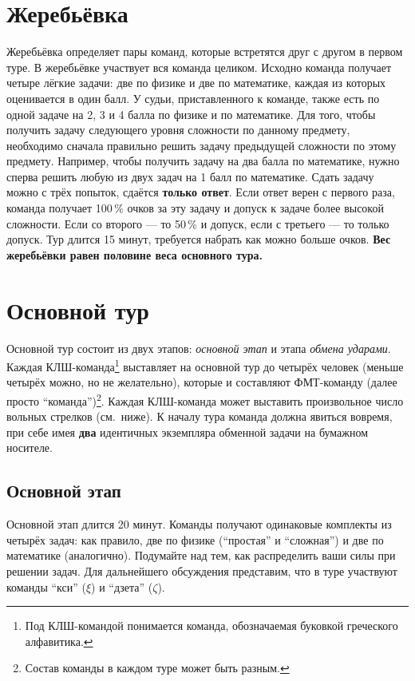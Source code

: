 \documentclass[12pt]{article}
\begin{document}
\section*{Жеребьёвка}
Жеребьёвка определяет пары команд, которые встретятся друг с другом в первом туре. В жеребьёвке участвует вся команда целиком. Исходно команда получает четыре лёгкие задачи: две по физике и две по математике, каждая из которых оценивается в один балл. У судьи, приставленного к команде, также есть по одной задаче на 2, 3 и 4 балла по физике и по математике. Для того, чтобы получить задачу следующего уровня сложности по данному предмету, необходимо сначала правильно решить задачу предыдущей сложности по этому предмету. Например, чтобы получить задачу на два балла по математике, нужно сперва решить любую из двух задач на 1 балл по математике. Сдать задачу можно с трёх попыток, сдаётся {\bf только ответ}. Если ответ верен с первого раза, команда получает 100\,\% очков за эту задачу и допуск к задаче более высокой сложности. Если со второго --- то 50\,\% и допуск, если с третьего --- то только допуск. Тур длится 15 минут, требуется набрать как можно больше очков. {\bf Вес жеребьёвки равен половине веса основного тура.}

\section*{Основной тур}
Основной тур состоит из двух этапов: \textsl{основной этап} и этапа \textsl{обмена ударами}. Каждая КЛШ-команда\footnote{Под КЛШ-командой понимается команда, обозначаемая буковкой греческого алфавитика.} выставляет на основной тур до четырёх человек (меньше четырёх можно, но не желательно), которые и составляют ФМТ-команду (далее просто ``команда'')\footnote{Состав команды в каждом туре может быть разным.}. Каждая КЛШ-команда может выставить произвольное число вольных стрелков (см.~ниже). К началу тура команда должна явиться вовремя, при себе имея {\bf два} идентичных экземпляра обменной задачи на бумажном носителе.

\subsection*{Основной этап}
Основной этап длится 20 минут. Команды получают одинаковые комплекты из четырёх задач: как правило, две по физике (``простая'' и ``сложная'') и две по математике (аналогично). Подумайте над тем, как распределить ваши силы при решении задач. Для дальнейшего обсуждения представим, что в туре участвуют команды ``кси'' ($\xi$) и ``дзета'' ($\zeta$).
\end{document}
